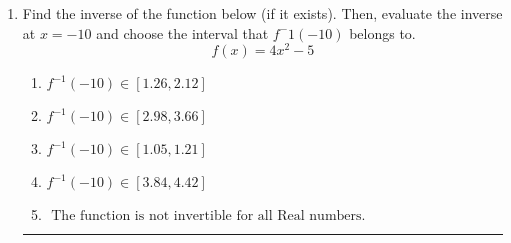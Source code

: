 \documentclass[14pt]{extbook}
\newcommand{\litem}[1]{\item#1\hspace*{-1cm}\rule{\textwidth}{0.4pt}}
\begin{document}
\begin{enumerate}
{\begin{enumerate}[label=\Alph*.]
\end{enumerate} }
\litem{
Find the inverse of the function below (if it exists). Then, evaluate the inverse at $x = -10$ and choose the interval that $f^-1(-10)$ belongs to.\[ f(x) = 4 x^2 - 5 \]\begin{enumerate}[label=\Alph*.]
\item \( f^{-1}(-10) \in [1.26, 2.12] \)
\item \( f^{-1}(-10) \in [2.98, 3.66] \)
\item \( f^{-1}(-10) \in [1.05, 1.21] \)
\item \( f^{-1}(-10) \in [3.84, 4.42] \)
\item \( \text{ The function is not invertible for all Real numbers. } \)

\end{enumerate} }
\end{enumerate}
\end{document}
